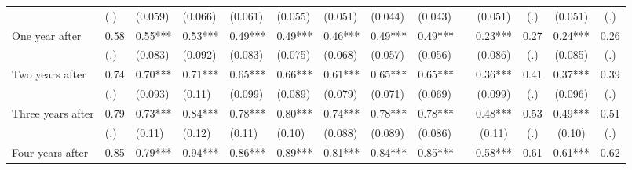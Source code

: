 \begin{tabular}{lccccrrrrrcccc}
      & \multicolumn{1}{l}{(.)} & \multicolumn{1}{l}{(0.059)} & \multicolumn{1}{l}{(0.066)} & \multicolumn{1}{l}{(0.061)} & \multicolumn{1}{l}{(0.055)} & \multicolumn{1}{l}{(0.051)} & \multicolumn{1}{l}{(0.044)} & \multicolumn{1}{l}{(0.043)} &       & (0.051) & (.)   & (0.051) & (.) \\
One year after & \multicolumn{1}{l}{0.58} & \multicolumn{1}{l}{0.55***} & \multicolumn{1}{l}{0.53***} & \multicolumn{1}{l}{0.49***} & \multicolumn{1}{l}{0.49***} & \multicolumn{1}{l}{0.46***} & \multicolumn{1}{l}{0.49***} & \multicolumn{1}{l}{0.49***} &       & 0.23*** & 0.27  & 0.24*** & 0.26 \\
      & \multicolumn{1}{l}{(.)} & \multicolumn{1}{l}{(0.083)} & \multicolumn{1}{l}{(0.092)} & \multicolumn{1}{l}{(0.083)} & \multicolumn{1}{l}{(0.075)} & \multicolumn{1}{l}{(0.068)} & \multicolumn{1}{l}{(0.057)} & \multicolumn{1}{l}{(0.056)} &       & (0.086) & (.)   & (0.085) & (.) \\
Two years after & \multicolumn{1}{l}{0.74} & \multicolumn{1}{l}{0.70***} & \multicolumn{1}{l}{0.71***} & \multicolumn{1}{l}{0.65***} & \multicolumn{1}{l}{0.66***} & \multicolumn{1}{l}{0.61***} & \multicolumn{1}{l}{0.65***} & \multicolumn{1}{l}{0.65***} &       & 0.36*** & 0.41  & 0.37*** & 0.39 \\
      & \multicolumn{1}{l}{(.)} & \multicolumn{1}{l}{(0.093)} & \multicolumn{1}{l}{(0.11)} & \multicolumn{1}{l}{(0.099)} & \multicolumn{1}{l}{(0.089)} & \multicolumn{1}{l}{(0.079)} & \multicolumn{1}{l}{(0.071)} & \multicolumn{1}{l}{(0.069)} &       & (0.099) & (.)   & (0.096) & (.) \\
Three years after & \multicolumn{1}{l}{0.79} & \multicolumn{1}{l}{0.73***} & \multicolumn{1}{l}{0.84***} & \multicolumn{1}{l}{0.78***} & \multicolumn{1}{l}{0.80***} & \multicolumn{1}{l}{0.74***} & \multicolumn{1}{l}{0.78***} & \multicolumn{1}{l}{0.78***} &       & 0.48*** & 0.53  & 0.49*** & 0.51 \\
      & \multicolumn{1}{l}{(.)} & \multicolumn{1}{l}{(0.11)} & \multicolumn{1}{l}{(0.12)} & \multicolumn{1}{l}{(0.11)} & \multicolumn{1}{l}{(0.10)} & \multicolumn{1}{l}{(0.088)} & \multicolumn{1}{l}{(0.089)} & \multicolumn{1}{l}{(0.086)} &       & (0.11) & (.)   & (0.10) & (.) \\
Four years after & \multicolumn{1}{l}{0.85} & \multicolumn{1}{l}{0.79***} & \multicolumn{1}{l}{0.94***} & \multicolumn{1}{l}{0.86***} & \multicolumn{1}{l}{0.89***} & \multicolumn{1}{l}{0.81***} & \multicolumn{1}{l}{0.84***} & \multicolumn{1}{l}{0.85***} &       & 0.58*** & 0.61  & 0.61*** & 0.62 \\

\end{tabular}
